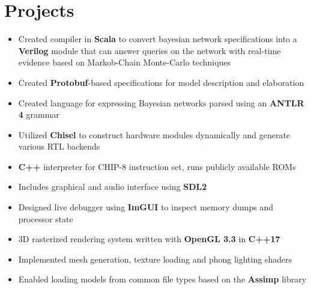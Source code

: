 \documentclass{moderncv}
\begin{document}
\section{Projects}
{\begin{itemize}
    \item Created compiler in \textbf{Scala} to convert bayesian network specifications into a \textbf{Verilog} module that can answer queries on the network with real-time evidence based on Markob-Chain Monte-Carlo techniques
    \item Created \textbf{Protobuf}-based specifications for model description and elaboration
    \item Created language for expressing Bayesian networks parsed using an \textbf{ANTLR 4} grammar
    \item Utilized \textbf{Chisel} to construct hardware modules dynamically and generate various RTL backends
\end{itemize}}

{\begin{itemize}
    \item \textbf{C++} interpreter for CHIP-8 instruction set, runs publicly available ROMs
    \item Includes graphical and audio interface using \textbf{SDL2}
    \item Designed live debugger using \textbf{ImGUI} to inspect memory dumps and processor state
\end{itemize}}

{\begin{itemize}
    \item 3D rasterized rendering system written with \textbf{OpenGL 3.3} in \textbf{C++17}
    \item Implemented mesh generation, texture loading and phong lighting shaders
    \item Enabled loading models from common file types based on the \textbf{Assimp} library
\end{itemize}}
\end{document}
